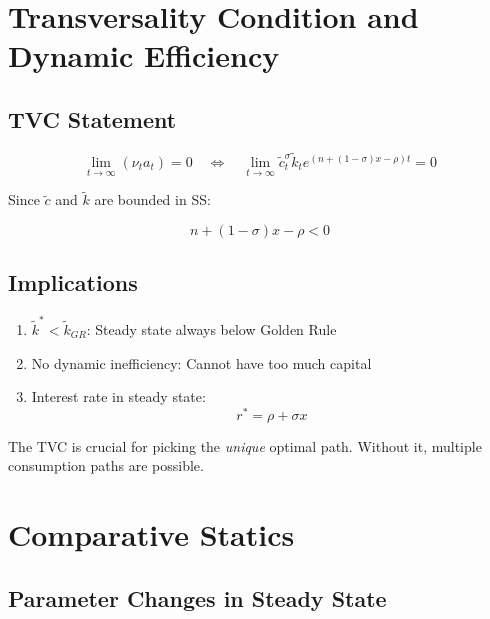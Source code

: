 \documentclass[a4paper,11pt]{article}
\newcommand{\ktilde}{\tilde{k}}
\newcommand{\ctilde}{\tilde{c}}
\begin{document}
\clearpage

\section*{Transversality Condition and Dynamic Efficiency}

\subsection*{TVC Statement}
\[
\lim_{t\to\infty} (\nu_t a_t) = 0
\quad \Longleftrightarrow \quad
\lim_{t\to\infty} \ctilde_t^\sigma \ktilde_t e^{(n + (1-\sigma)x - \rho)t} = 0
\]

Since $\ctilde$ and $\ktilde$ are bounded in SS:

\begin{resultbox}
\[
\boxed{n + (1-\sigma)x - \rho < 0}
\tag{TVC Condition}
\]
\end{resultbox}

\subsection*{Implications}
\begin{enumerate}
    \item $\ktilde^* < \ktilde_{GR}$: Steady state always below Golden Rule
    \item No dynamic inefficiency: Cannot have too much capital
    \item Interest rate in steady state:
    \[
    r^* = \rho + \sigma x
    \]
\end{enumerate}

\begin{warningbox}
The TVC is crucial for picking the \textit{unique} optimal path. Without it, multiple consumption paths are possible.
\end{warningbox}

\clearpage

\section*{Comparative Statics}

\subsection*{Parameter Changes in Steady State}
\end{document}
